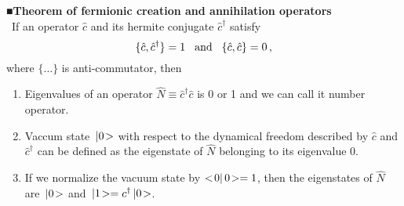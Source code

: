 \bigskip
\noindent
{\bf ■Theorem of fermionic creation and annihilation operators}\\\
If an operator $\hat{c}$ and its hermite conjugate $\hat{c}^\dagger$ satisfy
\begin{equation}
\{\hat{c}, \hat{c}^\dagger\} = 1
\hspace{3mm}
\mbox{and}
\hspace{3mm}
\{\hat{c}, \hat{c} \} = 0\,,
\end{equation}
where $\{\dots\}$ is anti-commutator, then
\begin{enumerate}
\item Eigenvalues of an operator $\hat{N} \equiv \hat{c}^\dagger \hat{c}$ is
0 or 1 and we can call it number operator.
\item Vaccum state $\,| 0 \!>$ with respect to the dynamical freedom described by $\hat{c}$
and $\hat{c}^\dagger$ can be defined as the eigenstate of
$\hat{N}$ belonging to its eigenvalue 0.
\item
If we normalize the vacuum state by $<\! 0 |\, 0 \!> = 1$, then the eigenstates
of $\hat{N}$ are $\,| 0 \!>$ and $\,| 1 \!> = c^\dagger \,| 0 \!>$.
\end{enumerate}






